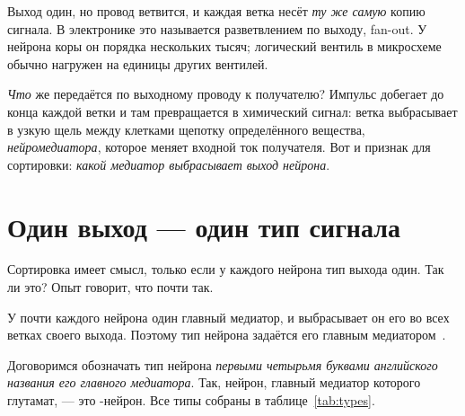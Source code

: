 Выход один, но провод ветвится, и каждая ветка несёт \emph{ту же самую} копию сигнала. В электронике это называется разветвлением по выходу, fan-out. У нейрона коры он порядка нескольких тысяч; логический вентиль в микросхеме обычно нагружен на единицы других вентилей.

\emph{Что} же передаётся по выходному проводу к получателю? Импульс добегает до конца каждой ветки и там превращается в химический сигнал: ветка выбрасывает в узкую щель между клетками щепотку определённого вещества, \emph{нейромедиатора}, которое меняет входной ток получателя. Вот и признак для сортировки: \emph{какой медиатор выбрасывает выход нейрона}.

\section{Один выход --- один тип сигнала}

Сортировка имеет смысл, только если у каждого нейрона тип выхода один. Так ли это? Опыт говорит, что почти так.

\begin{keyblock}
\begin{proposition}
\label{prop:dale}
У почти каждого нейрона один главный медиатор, и выбрасывает он его во всех ветках своего выхода. Поэтому тип нейрона задаётся его главным медиатором~\cite{Strata1999}.
\end{proposition}
\end{keyblock}

Договоримся обозначать тип нейрона \emph{первыми четырьмя буквами английского названия его главного медиатора}. Так, нейрон, главный медиатор которого глутамат, --- это -нейрон. Все типы собраны в таблице~\ref{tab:types}.

